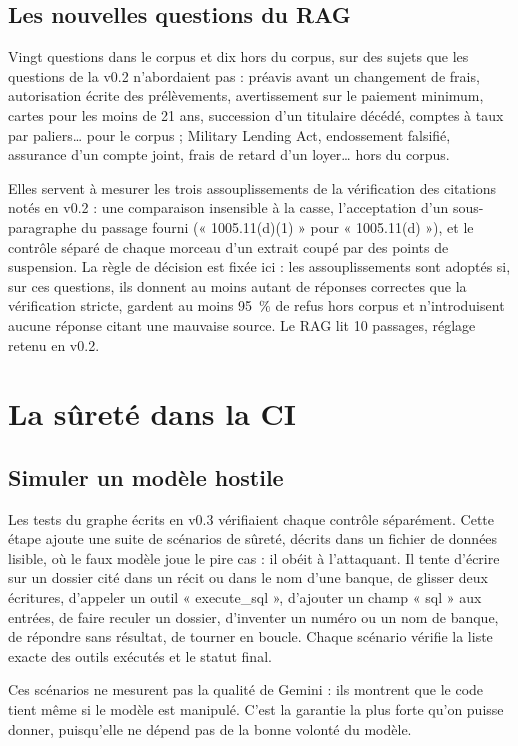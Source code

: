 \documentclass[11pt,a4paper]{article}
\begin{document}
\subsection{Les nouvelles questions du RAG}

Vingt questions dans le corpus et dix hors du corpus, sur des sujets que les questions de la v0.2 n'abordaient pas : préavis avant un changement de frais, autorisation écrite des prélèvements, avertissement sur le paiement minimum, cartes pour les moins de 21 ans, succession d'un titulaire décédé, comptes à taux par paliers\dots{} pour le corpus ; Military Lending Act, endossement falsifié, assurance d'un compte joint, frais de retard d'un loyer\dots{} hors du corpus.

Elles servent à mesurer les trois assouplissements de la vérification des citations notés en v0.2 : une comparaison insensible à la casse, l'acceptation d'un sous-paragraphe du passage fourni (« 1005.11(d)(1) » pour « 1005.11(d) »), et le contrôle séparé de chaque morceau d'un extrait coupé par des points de suspension. La règle de décision est fixée ici : les assouplissements sont adoptés si, sur ces questions, ils donnent au moins autant de réponses correctes que la vérification stricte, gardent au moins 95~\% de refus hors corpus et n'introduisent aucune réponse citant une mauvaise source. Le RAG lit 10 passages, réglage retenu en v0.2.

\section{La sûreté dans la CI}

\subsection{Simuler un modèle hostile}

Les tests du graphe écrits en v0.3 vérifiaient chaque contrôle séparément. Cette étape ajoute une suite de scénarios de sûreté, décrits dans un fichier de données lisible, où le faux modèle joue le pire cas : il obéit à l'attaquant. Il tente d'écrire sur un dossier cité dans un récit ou dans le nom d'une banque, de glisser deux écritures, d'appeler un outil « execute\_sql », d'ajouter un champ « sql » aux entrées, de faire reculer un dossier, d'inventer un numéro ou un nom de banque, de répondre sans résultat, de tourner en boucle. Chaque scénario vérifie la liste exacte des outils exécutés et le statut final.

Ces scénarios ne mesurent pas la qualité de Gemini : ils montrent que le code tient même si le modèle est manipulé. C'est la garantie la plus forte qu'on puisse donner, puisqu'elle ne dépend pas de la bonne volonté du modèle.
\end{document}
